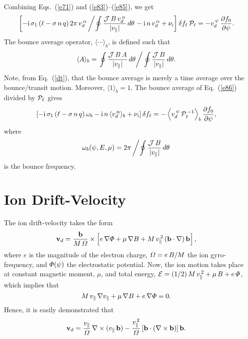 \documentclass[12pt,prb,aps,notitlepage]{revtex4-1}
\begin{document}
 Combining Eqs.~(\ref{e71}) and (\ref{e83})--(\ref{e85}), we get 
 \begin{equation}\label{e86}
 \left[-{\rm i}\,\sigma_1\,(\ell-\sigma\,n\,q)\,2\pi\,v_d^{\,\alpha}\left/\oint\frac{{\cal J}\,B\,v_d^{\,\alpha}}{|v_\parallel|}\,d\theta\right.-
 {\rm i}\,n\,v_d^{\,\alpha}+\nu_i\right]\delta f_{\ell}\,{\cal P}_{\ell} = - v_d^{\,\psi}\,\frac{\partial f_0}{\partial\psi}.
 \end{equation}
 The bounce average operator, $\langle \cdots\rangle_b$, is defined such that
 \begin{equation}\label{bounce}
 \langle A\rangle_b =\left.\oint\frac{{\cal J}\,B\,A}{|v_\parallel|}\,d\theta\right/ \oint\frac{{\cal J}\,B}{|v_\parallel|}\,d\theta.
 \end{equation}
 Note, from Eq.~(\ref{dt}), that the bounce average is merely a time average over the bounce/transit motion.  Moreover,  $\langle 1\rangle_b =1$. 
 The bounce average of Eq.~(\ref{e86}) divided by ${\cal P}_{\ell}$ gives
 \begin{equation}\label{e91}
 \left[-{\rm i}\,\sigma_1\,(\ell-\sigma\,n\,q)\,\omega_b -{\rm i}\,n\,\langle v_d^{\,\alpha}\rangle_b+\nu_i\right]\delta f_{\ell} = -
 \left\langle v_d^{\,\psi}\,{\cal P}_{\ell}^{\,-1}\right\rangle_b\frac{\partial f_0}{\partial\psi},
 \end{equation}
 where
 \begin{equation}\label{bouncef}
 \omega_b(\psi,E,\mu) = 2\pi\left/\oint\frac{{\cal J}\,B}{|v_\parallel|}\,d\theta\right.
 \end{equation}
 is the bounce frequency. 
 
\section{Ion Drift-Velocity}
The ion drift-velocity takes the form
\begin{equation}
{\bf v}_d =\frac{{\bf b}}{M\,{\mit\Omega}}\times\left[e\,\nabla{\mit\Phi}+ \mu\,\nabla B + M\,v_\parallel^{\,2}\,({\bf b}\cdot\nabla)\,{\bf b}\right],
\end{equation}
where $e$ is the magnitude of the electron charge, ${\mit\Omega}=e\,B/M$  the ion gyro-frequency, and ${\mit\Phi}(\psi)$  the
electrostatic potential. Now, the ion motion takes place at constant magnetic moment, $\mu$, and total energy,
 ${\cal E}= (1/2)\,M\,v_\parallel^{\,2}+ \mu\,B+e\,{\mit\Phi}$, 
 which implies that
 \begin{equation}
 M\,v_\parallel\,\nabla v_\parallel + \mu\,\nabla B + e\,\nabla{\mit\Phi}=0.
 \end{equation}
Hence,  it is easily
 demonstrated that
 \begin{equation}
 {\bf v}_d = \frac{v_\parallel}{{\mit\Omega}}\,\nabla\times (v_\parallel\,{\bf b}) - \frac{v_\parallel^{\,2}}{{\mit\Omega}}\,[{\bf b}\cdot(\nabla\times {\bf b})]\,{\bf b}.
 \end{equation}
 
\end{document}
